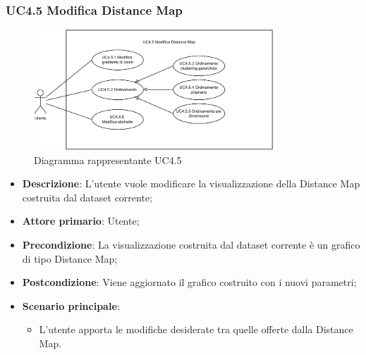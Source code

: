 \newpage
\subsubsection{UC4.5 Modifica Distance Map}
\label{par:uc4.5}
\begin{figure}[h]
    \centering
    \includegraphics[width=0.8\textwidth]{componenti/casi-duso/diagrammi/UC4_5.pdf}
    \caption{Diagramma rappresentante UC4.5}
    \label{fig:UC4.5}
\end{figure}

\begin{itemize}
    \item \textbf{Descrizione}: L'utente vuole modificare la visualizzazione della Distance Map costruita dal dataset corrente;
    \item \textbf{Attore primario}: Utente;
    \item \textbf{Precondizione}: La visualizzazione costruita dal dataset corrente è un grafico di tipo Distance Map;
    \item \textbf{Postcondizione}: Viene aggiornato il grafico costruito con i nuovi parametri;
    \item \textbf{Scenario principale}: 
    \begin{itemize}
        \item L'utente apporta le modifiche desiderate tra quelle offerte dalla Distance Map.
    \end{itemize}
\end{itemize}

